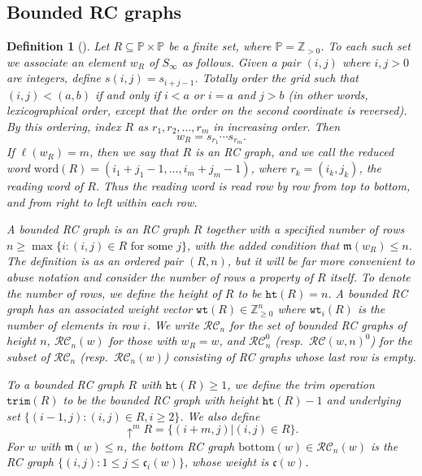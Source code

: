 \documentclass[pdflatex,sn-mathphys-num]{sn-jnl}
\numberwithin{equation}{subsection}
\newcommand{\shup}{{\uparrow}}
\newcommand{\wof}[1]{w_{#1}}
\newcommand{\wtt}{\mathtt{wt}}
\newcommand{\trm}{\mathtt{trim}}
\newcommand{\hr}{\mathtt{ht}}
\newcommand{\RC}{\mathcal{RC}}
\newcommand{\code}{\mathfrak{c}}
\newcommand{\maxd}{\mathfrak{m}}
\theoremstyle{thmstyleone}
\theoremstyle{thmstylethree}
\newtheorem{definition}[lemma]{Definition}
\theoremstyle{thmstyletwo}
\begin{document}
\subsection{Bounded RC graphs}\label{section:brc}

\begin{definition}[{\cite[Definition~\ref*{B-definition:rcgraph}]{samuelbialgebra}}]\label{definition:rcgraph}
	Let $R\subseteq \mathbb{P}\times \mathbb{P}$ be a finite set, where $\mathbb{P}=\mathbb{Z}_{>0}$. To each such set we associate an element $\wof{R}$ of $S_\infty$ as follows. Given a pair $(i, j)$ where $i,j>0$ are integers, define $s(i,j) = s_{i+j - 1}$. Totally order the grid such that $(i, j) < (a, b)$ if and only if $i < a$ or $i = a$ and $j > b$ (in other words, lexicographical order, except that the order on the second coordinate is reversed). By this ordering, index $R$ as $r_1, r_2,\ldots, r_m$ in increasing order. Then
	$$\wof{R} = s_{r_1}\cdots s_{r_m}.$$
	If $\ell(\wof{R}) = m$, then we say that $R$ is an \emph{RC graph}, and we call the reduced word $\mathrm{word}(R)=(i_1+j_1-1,\ldots,i_m+j_m-1)$, where $r_k=(i_k,j_k)$, the \emph{reading word} of $R$. Thus the reading word is read row by row from top to bottom, and from right to left within each row.
	
	A \emph{bounded RC graph} is an RC graph $R$ together with a specified number of rows $n\geq \max\{i: (i,j)\in R\text{ for some }j\}$, with the added condition that $\maxd(\wof{R})\leq n$. The definition is as an ordered pair $(R, n)$, but it will be far more convenient to abuse notation and consider the number of rows a property of $R$ itself. To denote the number of rows, we define the \emph{height} of $R$ to be $\hr(R)=n$. A bounded RC graph has an associated weight vector $\wtt(R)\in\mathbb{Z}_{\geq 0}^n$ where $\wtt_i(R)$ is the number of elements in row $i$. We write $\RC_n$ for the set of bounded RC graphs of height $n$, $\RC_n(w)$ for those with $\wof{R}=w$, and $\RC_n^0$ (resp.\ $\RC(w,n)^0$) for the subset of $\RC_n$ (resp.\ $\RC_n(w)$) consisting of RC graphs whose last row is empty.
	
	To a bounded RC graph $R$ with $\hr(R)\geq 1$, we define the \emph{trim} operation $\trm(R)$ to be the bounded RC graph with height $\hr(R)-1$ and underlying set $\{(i-1, j): (i,j)\in R, i\geq 2\}$. We also define
	$$\shup^m R=\{(i+m, j)| (i,j)\in R\}.$$
	For $w$ with $\maxd(w)\leq n$, the \emph{bottom RC graph} $\mathrm{bottom}(w)\in\RC_n(w)$ is the RC graph $\{(i,j): 1\leq j\leq \code_i(w)\}$, whose weight is $\code(w)$.
\end{definition}
\end{document}
